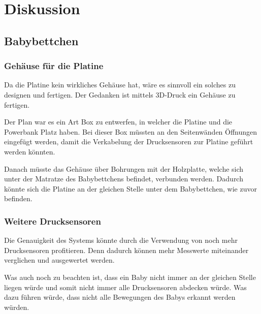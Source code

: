  \chapter{Diskussion}

\section[Babybettchen]{Babybettchen}
\subsection[Gehäuse für die Platine]{Gehäuse für die Platine\authorlinda} \label{Platinen-Gehäuse}
Da die Platine kein wirkliches Gehäuse hat, wäre es sinnvoll ein solches zu designen und fertigen. Der Gedanken ist mittels 3D-Druck ein Gehäuse zu fertigen. 

\par\vspace{1em}

\noindent
Der Plan war es ein Art Box zu entwerfen, in welcher die Platine und die Powerbank Platz haben. Bei dieser Box müssten an den Seitenwänden Öffnungen eingefügt werden, damit die Verkabelung der Drucksensoren zur Platine geführt werden könnten.

\noindent
Danach müsste das Gehäuse über Bohrungen mit der Holzplatte, welche sich unter der Matratze des Babybettchens befindet, verbunden werden. Dadurch könnte sich die Platine an der gleichen Stelle unter dem Babybettchen, wie zuvor befinden.

\subsection[Weitere Drucksensoren]{Weitere Drucksensoren\authorlinda} \label{weitere Drucksensoren}
Die Genauigkeit des Systems könnte durch die Verwendung von noch mehr Drucksensoren profitieren. Denn dadurch können mehr Messwerte miteinander verglichen und ausgewertet werden.

\noindent
Was auch noch zu beachten ist, dass ein Baby nicht immer an der gleichen Stelle liegen würde und somit nicht immer alle Drucksensoren abdecken würde. Was dazu führen würde, dass nicht alle Bewegungen des Babys erkannt werden würden.

